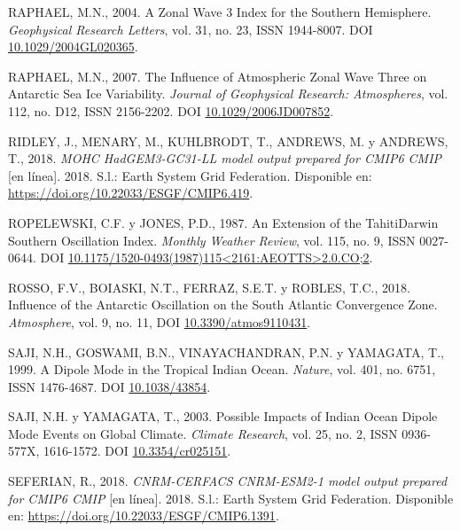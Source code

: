 \documentclass[12pt,oneside,a4paper]{reedthesis}
\newlength{\cslhangindent}
\newenvironment{CSLReferences}[2] %
 {%
  \setlength{\parindent}{0pt}
  \ifodd #1 \everypar{\setlength{\hangindent}{\cslhangindent}}\ignorespaces\fi
  \ifnum #2 > 0
  \setlength{\parskip}{#2\baselineskip}
  \fi
 }%
 {}
\begin{document}
\begin{CSLReferences}{1}{0}
\leavevmode{}%
RAPHAEL, M.N., 2004. A Zonal Wave 3 Index for the {Southern Hemisphere}. \emph{Geophysical Research Letters}, vol. 31, no. 23, ISSN 1944-8007. DOI \href{https://doi.org/10.1029/2004GL020365}{10.1029/2004GL020365}.

\leavevmode{}%
RAPHAEL, M.N., 2007. The Influence of Atmospheric Zonal Wave Three on {Antarctic} Sea Ice Variability. \emph{Journal of Geophysical Research: Atmospheres}, vol. 112, no. D12, ISSN 2156-2202. DOI \href{https://doi.org/10.1029/2006JD007852}{10.1029/2006JD007852}.

\leavevmode{}%
RIDLEY, J., MENARY, M., KUHLBRODT, T., ANDREWS, M. y ANDREWS, T., 2018. \emph{MOHC HadGEM3-GC31-LL model output prepared for CMIP6 CMIP} {[}en línea{]}. 2018. S.l.: Earth System Grid Federation. Disponible en: \url{https://doi.org/10.22033/ESGF/CMIP6.419}.

\leavevmode{}%
ROPELEWSKI, C.F. y JONES, P.D., 1987. An {Extension} of the {Tahiti}{\textendash}{Darwin Southern Oscillation Index}. \emph{Monthly Weather Review}, vol. 115, no. 9, ISSN 0027-0644. DOI \href{https://doi.org/10.1175/1520-0493(1987)115\%3C2161:AEOTTS\%3E2.0.CO;2}{10.1175/1520-0493(1987)115\textless2161:AEOTTS\textgreater2.0.CO;2}.

\leavevmode{}%
ROSSO, F.V., BOIASKI, N.T., FERRAZ, S.E.T. y ROBLES, T.C., 2018. Influence of the {Antarctic Oscillation} on the {South Atlantic Convergence Zone}. \emph{Atmosphere}, vol. 9, no. 11, DOI \href{https://doi.org/10.3390/atmos9110431}{10.3390/atmos9110431}.

\leavevmode{}%
SAJI, N.H., GOSWAMI, B.N., VINAYACHANDRAN, P.N. y YAMAGATA, T., 1999. A Dipole Mode in the Tropical {Indian Ocean}. \emph{Nature}, vol. 401, no. 6751, ISSN 1476-4687. DOI \href{https://doi.org/10.1038/43854}{10.1038/43854}.

\leavevmode{}%
SAJI, N.H. y YAMAGATA, T., 2003. Possible Impacts of {Indian Ocean Dipole} Mode Events on Global Climate. \emph{Climate Research}, vol. 25, no. 2, ISSN 0936-577X, 1616-1572. DOI \href{https://doi.org/10.3354/cr025151}{10.3354/cr025151}.

\leavevmode{}%
SEFERIAN, R., 2018. \emph{CNRM-CERFACS CNRM-ESM2-1 model output prepared for CMIP6 CMIP} {[}en línea{]}. 2018. S.l.: Earth System Grid Federation. Disponible en: \url{https://doi.org/10.22033/ESGF/CMIP6.1391}.


\end{CSLReferences}
\end{document}
